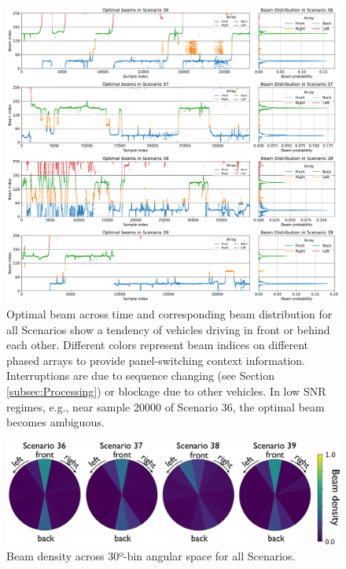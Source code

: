 \documentclass[10pt,comsoc]{IEEEtran}
\begin{document}
\begin{figure}[t]
	\centering
	\includegraphics[width=2.04\columnwidth]{beam_distributions2}
	\caption{Optimal beam across time and corresponding beam distribution for all Scenarios show a tendency of vehicles driving in front or behind each other. Different colors represent beam indices on different phased arrays to provide panel-switching context information. Interruptions are due to sequence changing (see Section \ref{subsec:Processing}) or blockage due to other vehicles. In low SNR regimes, e.g., near sample 20000 of Scenario 36, the optimal beam becomes ambiguous.}
	\label{fig:beam_distro}
\end{figure}

\begin{figure}[!t]
	\centering
	\includegraphics[width=1\columnwidth]{beam_density6}
	\caption{Beam density across 30º-bin angular space for all Scenarios.}
	\label{fig:beam_density}
	\vspace*{-.1cm}
\end{figure}
\end{document}
